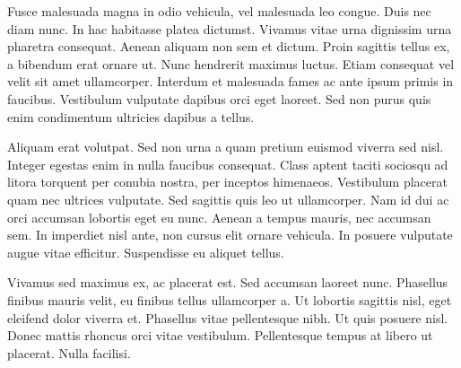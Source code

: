 \documentclass[12pt,a4paper,openright,twoside]{report}
\begin{document}
Fusce malesuada magna in odio vehicula, vel malesuada leo congue. Duis nec diam nunc. In hac habitasse platea dictumst. Vivamus vitae urna dignissim urna pharetra consequat. Aenean aliquam non sem et dictum. Proin sagittis tellus ex, a bibendum erat ornare ut. Nunc hendrerit maximus luctus. Etiam consequat vel velit sit amet ullamcorper. Interdum et malesuada fames ac ante ipsum primis in faucibus. Vestibulum vulputate dapibus orci eget laoreet. Sed non purus quis enim condimentum ultricies dapibus a tellus.

Aliquam erat volutpat. Sed non urna a quam pretium euismod viverra sed nisl. Integer egestas enim in nulla faucibus consequat. Class aptent taciti sociosqu ad litora torquent per conubia nostra, per inceptos himenaeos. Vestibulum placerat quam nec ultrices vulputate. Sed sagittis quis leo ut ullamcorper. Nam id dui ac orci accumsan lobortis eget eu nunc. Aenean a tempus mauris, nec accumsan sem. In imperdiet nisl ante, non cursus elit ornare vehicula. In posuere vulputate augue vitae efficitur. Suspendisse eu aliquet tellus.

Vivamus sed maximus ex, ac placerat est. Sed accumsan laoreet nunc. Phasellus finibus mauris velit, eu finibus tellus ullamcorper a. Ut lobortis sagittis nisl, eget eleifend dolor viverra et. Phasellus vitae pellentesque nibh. Ut quis posuere nisl. Donec mattis rhoncus orci vitae vestibulum. Pellentesque tempus at libero ut placerat. Nulla facilisi.
\end{document}

